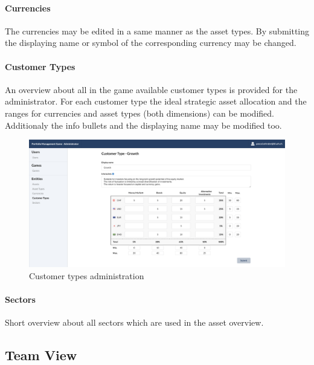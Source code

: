 \paragraph{Currencies}
The currencies may be edited in a same manner as the asset types. By submitting the displaying name or symbol of the corresponding currency may be changed.

\paragraph{Customer Types}
An overview about all in the game available customer types is provided for the administrator. For each customer type the ideal strategic asset allocation and the ranges for currencies and asset types (both dimensions) can be modified. Additionaly the info bullets and the displaying name may be modified too.
\begin{figure}[h!]
  \centering
  \includegraphics[scale=0.2]{img/application-overview/administrator/entities_customer_types.png}
  \caption{Customer types administration}
\end{figure}


\paragraph{Sectors}
Short overview about all sectors which are used in the asset overview.





\subsection{Team View}

